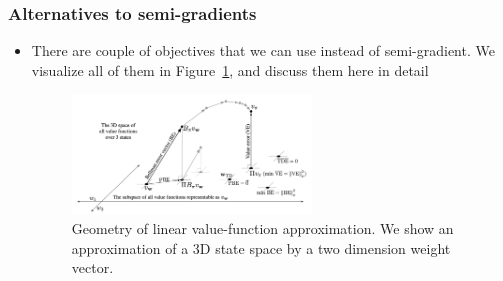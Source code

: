 \subsubsection{Alternatives to semi-gradients}
\begin{itemize}
	\item There are couple of objectives that we can use instead of semi-gradient. We visualize all of them in Figure~\ref{fig:rl_approximation_value_based_different_errors}, and discuss them here in detail
	\begin{figure}[ht!]
		\centering
		\includegraphics[width=0.6\textwidth]{figures/rl_approximation_value_based_different_errors.png}
		\caption{Geometry of linear value-function approximation. We show an approximation of a 3D state space by a two dimension weight vector.}
		\label{fig:rl_approximation_value_based_different_errors}
	\end{figure}
	

\end{itemize}
